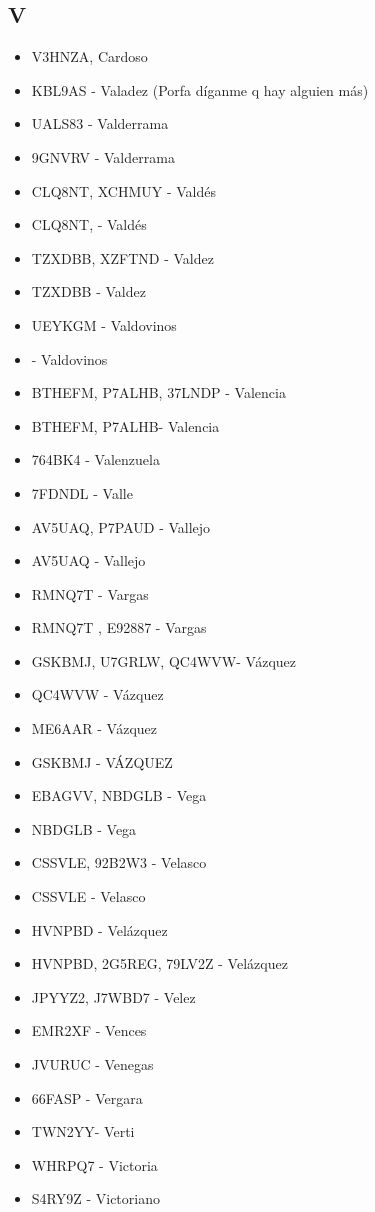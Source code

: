 \subsection*{V}
\begin{itemize}[leftmargin=*,nosep]
\item V3HNZA, Cardoso
\item KBL9AS - Valadez (Porfa díganme q hay alguien más)
\item UALS83   - Valderrama
\item 9GNVRV - Valderrama
\item CLQ8NT, XCHMUY - Valdés
\item CLQ8NT,  - Valdés
\item TZXDBB, XZFTND - Valdez
\item TZXDBB  -  Valdez
\item UEYKGM - Valdovinos
\item - Valdovinos
\item BTHEFM, P7ALHB, 37LNDP - Valencia
\item BTHEFM, P7ALHB- Valencia
\item 764BK4  -  Valenzuela
\item 7FDNDL - Valle
\item AV5UAQ, P7PAUD - Vallejo
\item AV5UAQ - Vallejo
\item RMNQ7T  -  Vargas
\item RMNQ7T , E92887 - Vargas
\item GSKBMJ, U7GRLW, QC4WVW- Vázquez
\item QC4WVW - Vázquez
\item ME6AAR -  Vázquez
\item GSKBMJ - VÁZQUEZ
\item EBAGVV, NBDGLB - Vega
\item NBDGLB - Vega
\item CSSVLE, 92B2W3 - Velasco
\item CSSVLE - Velasco
\item HVNPBD - Velázquez
\item HVNPBD, 2G5REG, 79LV2Z - Velázquez
\item JPYYZ2, J7WBD7 - Velez
\item EMR2XF - Vences
\item JVURUC - Venegas
\item 66FASP  -  Vergara
\item TWN2YY- Verti
\item WHRPQ7  -  Victoria
\item S4RY9Z - Victoriano

\end{itemize}
